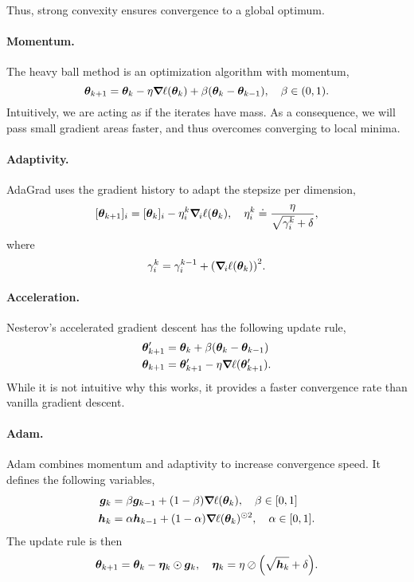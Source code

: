 Thus, strong convexity ensures convergence to a global optimum.

\paragraph{Momentum.}

The heavy ball method is an optimization algorithm with momentum, \[
    \vec{\theta}_{k+1} = \vec{\theta}_k - \eta \grad{\ell(\vec{\theta}_k)}{} + \beta (\vec{\theta}_k - \vec{\theta}_{k-1}), \quad \beta \in (0,1).
\]
Intuitively, we are acting as if the iterates have mass. As a consequence, we will pass small
gradient areas faster, and thus overcomes converging to local minima.

\paragraph{Adaptivity.}

AdaGrad uses the gradient history to adapt the stepsize per dimension, \[
    [\vec{\theta}_{k+1}]_i = [\vec{\theta}_k]_i - \eta_i^k \grad{\ell(\vec{\theta}_k)}{i}, \quad \eta_i^k \doteq \frac{\eta}{\sqrt{\gamma_i^k} + \delta},
\]
where \[
    \gamma_i^k = \gamma_i^{k-1} + \lft( \grad{\ell(\vec{\theta}_k)}{i} \rgt)^2.
\]

\paragraph{Acceleration.}

Nesterov's accelerated gradient descent has the following update rule,
\begin{align*}
    \vec{\theta}_{k+1}' & = \vec{\theta}_k + \beta (\vec{\theta}_k - \vec{\theta}_{k-1})   \\
    \vec{\theta}_{k+1}  & = \vec{\theta}_{k+1}' - \eta \grad{\ell(\vec{\theta}_{k+1}')}{}.
\end{align*}
While it is not intuitive why this works, it provides a faster convergence rate than vanilla gradient
descent.

\paragraph{Adam.}

Adam combines momentum and adaptivity to increase convergence speed. It defines the following
variables,
\begin{align*}
    \vec{g}_k & = \beta \vec{g}_{k-1} + (1- \beta) \grad{\ell(\vec{\theta}_k)}{}, \quad \beta \in [0,1]              \\
    \vec{h}_k & = \alpha \vec{h}_{k-1} + (1-\alpha) \grad{\ell(\vec{\theta}_k)}{}^{\odot 2}, \quad \alpha \in [0,1].
\end{align*}
The update rule is then \[
    \vec{\theta}_{k+1} = \vec{\theta}_k - \vec{\eta}_k \odot \vec{g}_k, \quad \vec{\eta}_k = \eta \oslash \lft( \sqrt{\vec{h}_k} + \delta \rgt).
\]

